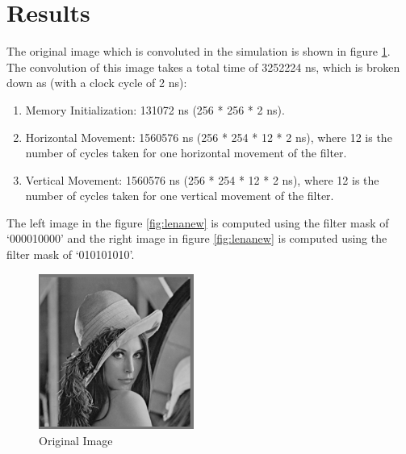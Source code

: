 \documentclass[11pt,a4paper]{article}
\begin{document}
\section{Results}
\label{sec:results}

The original image which is convoluted in the simulation is shown in figure \ref{fig:lena}. The convolution of this image takes a total time of 3252224 ns, which is broken down as (with a clock cycle of 2 ns):

\begin{enumerate}
\item Memory Initialization: 131072 ns (256 * 256 * 2 ns).
\item Horizontal Movement: 1560576 ns (256 * 254 * 12 * 2 ns), where 12 is the number of cycles taken for one horizontal movement of the filter.
\item Vertical Movement: 1560576 ns (256 * 254 * 12 * 2 ns), where 12 is the number of cycles taken for one vertical movement of the filter.
\end{enumerate}

The left image in the figure \ref{fig:lenanew} is computed using the filter mask of `000010000' and the right image in figure \ref{fig:lenanew} is computed using the filter mask of `010101010'.

\begin{figure}[h]
	\centering
		\includegraphics[width=2in]{./images/lena.PNG}
	\caption{Original Image}	
	\label{fig:lena}
\end{figure}

\FloatBarrier
\end{document}
